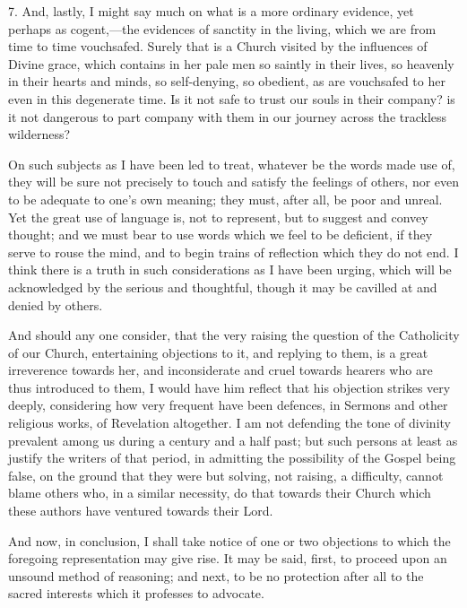 7. And, lastly, I might say much on what is a more ordinary
evidence, yet perhaps as cogent,—the evidences of sanctity in the
living, which we are from time to time vouchsafed. Surely that is a
Church visited by the influences of Divine grace, which contains in
her pale men so saintly in their lives, so heavenly in their hearts
and minds, so self-denying, so obedient, as are vouchsafed to her even
in this degenerate time. Is it not safe to trust our souls in their
company? is it not dangerous to part company with them in our journey
across the trackless wilderness?

On such subjects as I have been led to treat, whatever be the words
made use of, they will be sure not precisely to touch and satisfy the
feelings of others, nor even to be adequate to one's own meaning; they
must, after all, be poor and unreal. Yet the great use of language is,
not to represent, but to suggest and convey thought; and we must bear
to use words which we feel to be deficient, if they serve to rouse the
mind, and to begin trains of reflection which they do not end. I think
there is a truth in such considerations as I have been urging, which
will be acknowledged by the serious and thoughtful, though it may be
cavilled at and denied by others.

And should any one consider, that the very raising the question of
the Catholicity of our Church, entertaining objections to it, and
replying to them, is a great irreverence towards her, and
inconsiderate and cruel towards hearers who are thus introduced to
them, I would have him reflect that his objection strikes very deeply,
considering how very frequent have been defences, in Sermons and other
religious works, of Revelation altogether. I am not defending the tone
of divinity prevalent among us during a century and a half past; but
such persons at least as justify the writers of that period, in
admitting the possibility of the Gospel being false, on the ground
that they were but solving, not raising, a difficulty, cannot blame
others who, in a similar necessity, do that towards their Church which
these authors have ventured towards their Lord.

And now, in conclusion, I shall take notice of one or two
objections to which the foregoing representation may give rise. It may
be said, first, to proceed upon an unsound method of reasoning; and
next, to be no protection after all to the sacred interests which it
professes to advocate.

